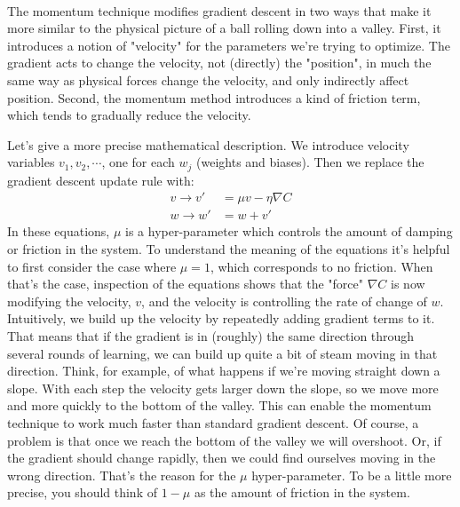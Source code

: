 \paragraph{} The momentum technique modifies gradient descent in two ways that make it more similar to the physical picture of a ball rolling down into a valley. First, it introduces a notion of "velocity" for the parameters we're trying to optimize. The gradient acts to change the velocity, not (directly) the "position", in much the same way as physical forces change the velocity, and only indirectly affect position. Second, the momentum method introduces a kind of friction term, which tends to gradually reduce the velocity.

Let's give a more precise mathematical description. We introduce velocity variables $v_1, v_2, \cdots$, one for each $w_j$ (weights and biases). Then we replace the gradient descent update rule with:
\begin{equation}
\begin{aligned}
v \rightarrow v' &= \mu  v - \eta \nabla C \\
w \rightarrow w' &= w + v'
\end{aligned}
\end{equation}
In these equations, $\mu$ is a hyper-parameter which controls the amount of damping or friction in the system. To understand the meaning of the equations it's helpful to first consider the case where $\mu=1$, which corresponds to no friction. When that's the case, inspection of the equations shows that the "force" $\nabla C$ is now modifying the velocity, $v$, and the velocity is controlling the rate of change of $w$. Intuitively, we build up the velocity by repeatedly adding gradient terms to it. That means that if the gradient is in (roughly) the same direction through several rounds of learning, we can build up quite a bit of steam moving in that direction. Think, for example, of what happens if we're moving straight down a slope. With each step the velocity gets larger down the slope, so we move more and more quickly to the bottom of the valley. This can enable the momentum technique to work much faster than standard gradient descent. Of course, a problem is that once we reach the bottom of the valley we will overshoot. Or, if the gradient should change rapidly, then we could find ourselves moving in the wrong direction. That's the reason for the $\mu$ hyper-parameter. To be a little more precise, you should think of $1-\mu$ as the amount of friction in the system.

